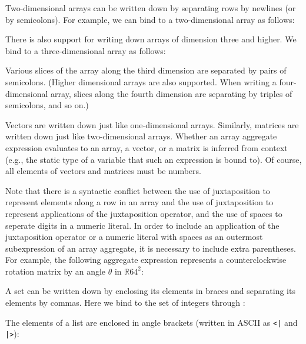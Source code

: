 \label{arrayAInf}


Two-dimensional arrays can be written down by separating rows by newlines (or by semicolons). For example, we can
bind  to a two-dimensional array as follows:

\label{arrayBInf}


There is also support for writing down arrays of dimension three and higher. We bind  to a three-dimensional
array as follows:

\label{arrayCInf}


Various slices of the array along the third dimension are separated by pairs of semicolons.
(Higher dimensional arrays
are also supported. When writing a four-dimensional
array, slices along the fourth dimension are separating by triples of semicolons, and so on.)

Vectors are written down just like one-dimensional arrays.
Similarly, matrices are written down just like two-dimensional arrays.
Whether an array aggregate expression evaluates to an array, a vector, or a
matrix is inferred from context
(e.g., the static type of a variable that such an expression is bound to).
Of course, all elements of vectors and matrices must be numbers.

Note that there is a syntactic conflict between the use of juxtaposition to
represent elements along a row in an array and the use of juxtaposition to represent
applications of the juxtaposition operator, and the use of spaces to seperate digits in a numeric literal.
In order to include an application of the juxtaposition operator or a numeric literal with spaces
as an outermost subexpression of an array aggregate, it is necessary to include extra parentheses. For example,
the following aggregate expression represents a counterclockwise rotation matrix by an angle $\theta{}$ in $\mathbb{R}64^2$:




A set can be written down by enclosing its elements in braces and separating its elements by commas.
Here we bind  to the set of integers  through :



The elements of a list are enclosed in angle brackets (written in ASCII as
\verb$<|$ and \verb$|>$):


